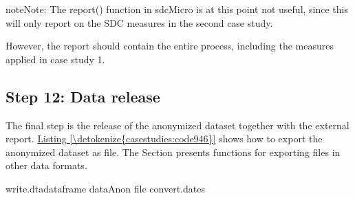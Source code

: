 \documentclass[letterpaper,10pt,english]{sphinxmanual}
\begin{document}
\begin{sphinxadmonition}{note}{Note:}
The report() function in sdcMicro is at this point not useful, since this will
only report on the SDC measures in the second case study.
\end{sphinxadmonition}

However, the report should contain the entire process, including the measures applied
in case study 1.


\subsection{Step 12: Data release}
\label{\detokenize{casestudies:id16}}
The final step is the release of the anonymized dataset together with
the external report. \hyperref[\detokenize{casestudies:code946}]{Listing \ref{\detokenize{casestudies:code946}}} shows how to export the anonymized
dataset as  file. The Section 
presents functions for exporting files in other data formats.

\def\sphinxLiteralBlockLabel{\label{\detokenize{casestudies:code946}}}
%
\begin{sphinxVerbatim}[commandchars=\\\{\},numbers=left,firstnumber=1,stepnumber=1]
write.dtadataframe  dataAnon file  convert.dates
\end{sphinxVerbatim}



\renewcommand{\indexname}{Index}
\printindex
\end{document}

